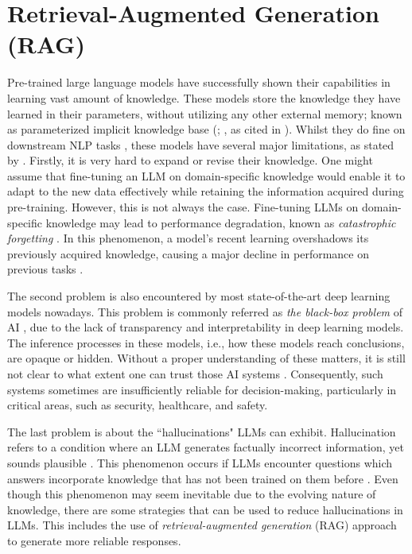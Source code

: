 \section{Retrieval-Augmented Generation (RAG)}
\label{sec:rag}
Pre-trained large language models have successfully shown their capabilities in learning vast amount of knowledge. These models store the knowledge they have learned in their parameters, without utilizing any other external memory; known as parameterized implicit knowledge base (\citealp{raffel2023exploringlimitstransferlearning}; \citealp{roberts2020knowledgepackparameterslanguage}, as cited in \citealp{lewis2021retrievalaugmentedgenerationknowledgeintensivenlp}). Whilst they do fine on downstream NLP tasks \citep{9412102}, these models have several major limitations, as stated by \cite{lewis2021retrievalaugmentedgenerationknowledgeintensivenlp}. Firstly, it is very hard to expand or revise their knowledge. One might assume that fine-tuning an LLM on domain-specific knowledge would enable it to adapt to the new data effectively while retaining the information acquired during pre-training. However, this is not always the case. Fine-tuning LLMs on domain-specific knowledge may lead to performance degradation, known as \textit{catastrophic forgetting} \citep{kaushik2021understandingcatastrophicforgettingremembering}. In this phenomenon, a model's recent learning overshadows its previously acquired knowledge, causing a major decline in performance on previous tasks \citep{liu2024catastrophicforgettingintegratinggeneral}.

The second problem is also encountered by most state-of-the-art deep learning models nowadays. This problem is commonly referred as \textit{the black-box problem} of AI \citep{blackboxai}, due to the lack of transparency and interpretability in deep learning models. The inference processes in these models, i.e., how these models reach conclusions, are opaque or hidden. Without a proper understanding of these matters, it is still not clear to what extent one can trust those AI systems \citep{blackboxai}. Consequently, such systems sometimes are insufficiently reliable for decision-making, particularly in critical areas, such as security, healthcare, and safety.

The last problem is about the ``hallucinations" LLMs can exhibit. Hallucination refers to a condition where an LLM generates factually incorrect information, yet sounds plausible \citep{llmhallucination}. This phenomenon occurs if LLMs encounter questions which answers incorporate knowledge that has not been trained on them before \citep{llmhallu1}. Even though this phenomenon may seem inevitable due to the evolving nature of knowledge, there are some strategies that can be used to reduce hallucinations in LLMs. This includes the use of \textit{retrieval-augmented generation} (RAG) approach to generate more reliable responses.

